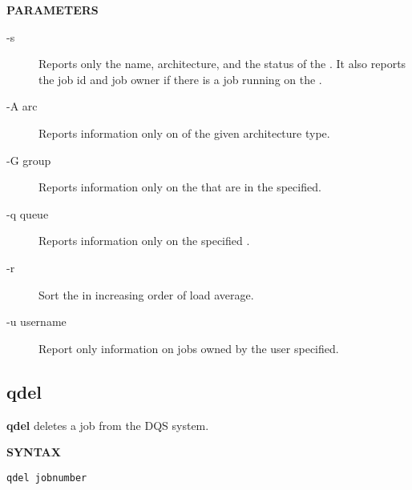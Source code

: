 {\bf PARAMETERS}
\begin{description}

\item[-s]  Reports only the \queue name, architecture, and the status
of the \queue.  It also reports the job id and job owner if there is a
job running on the \queue.

\item[-A arc]  Reports information only on \queues of the given
architecture type.

\item[-G group]  Reports information only on the \queues that are in
the \group specified.

\item[-q queue] Reports information only on the specified \queue.

\item[-r] Sort the \queues in increasing order of load average.

\item[-u username] Report only information on jobs owned by the user
specified.

\end{description}

\subsection{qdel}

{\bf qdel} deletes a job from the DQS system.

{\bf SYNTAX}

\begin{verbatim}
qdel jobnumber
\end{verbatim}
